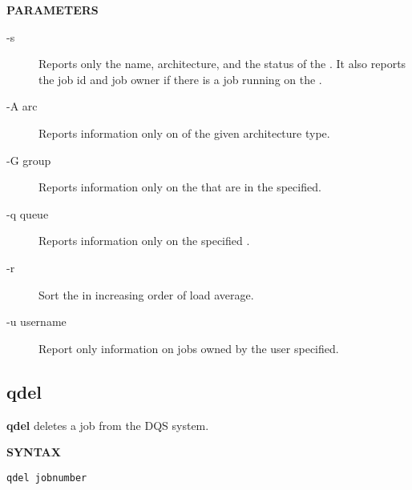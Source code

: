 {\bf PARAMETERS}
\begin{description}

\item[-s]  Reports only the \queue name, architecture, and the status
of the \queue.  It also reports the job id and job owner if there is a
job running on the \queue.

\item[-A arc]  Reports information only on \queues of the given
architecture type.

\item[-G group]  Reports information only on the \queues that are in
the \group specified.

\item[-q queue] Reports information only on the specified \queue.

\item[-r] Sort the \queues in increasing order of load average.

\item[-u username] Report only information on jobs owned by the user
specified.

\end{description}

\subsection{qdel}

{\bf qdel} deletes a job from the DQS system.

{\bf SYNTAX}

\begin{verbatim}
qdel jobnumber
\end{verbatim}
